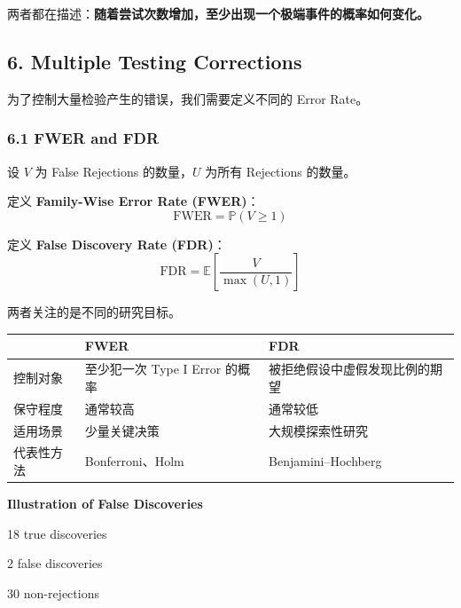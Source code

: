两者都在描述：\textbf{随着尝试次数增加，至少出现一个极端事件的概率如何变化。}

\hypertarget{part-2-16-0001-multiple-testing-corrections}{%
\subsection{6. Multiple Testing Corrections}\label{part-2-16-0001-multiple-testing-corrections}}

为了控制大量检验产生的错误，我们需要定义不同的 Error Rate。

\hypertarget{part-2-16-0001-fwer-and-fdr}{%
\subsubsection{6.1 FWER and FDR}\label{part-2-16-0001-fwer-and-fdr}}

设 \(V\) 为 False Rejections 的数量，\(U\) 为所有 Rejections 的数量。

定义 \textbf{Family-Wise Error Rate (FWER)}：
\[\boxed{
\mathrm{FWER}=\mathbb P(V\geq1)
}\]

定义 \textbf{False Discovery Rate (FDR)}：
\[\boxed{
\mathrm{FDR}
=
\mathbb E\left[\frac{V}{\max(U,1)}\right]
}\]

两者关注的是不同的研究目标。

\begin{readertable}
\begin{longtable}[]{@{}
  >{\raggedright\arraybackslash}p{}
  >{\raggedright\arraybackslash}p{}
  >{\raggedright\arraybackslash}p{}@{}}
\toprule
& FWER & FDR \\
\midrule
\endhead
控制对象 & 至少犯一次 Type I Error 的概率 & 被拒绝假设中虚假发现比例的期望 \\
保守程度 & 通常较高 & 通常较低 \\
适用场景 & 少量关键决策 & 大规模探索性研究 \\
代表性方法 & Bonferroni、Holm & Benjamini--Hochberg \\
\bottomrule
\end{longtable}
\end{readertable}

\textbf{Illustration of False Discoveries}

18 true discoveries

2 false discoveries

30 non-rejections

